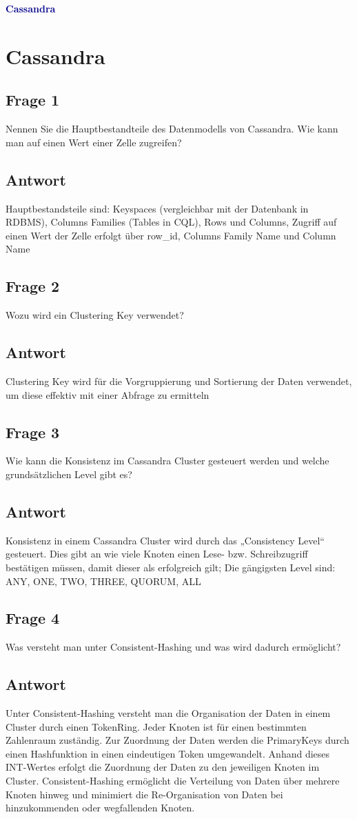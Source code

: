 \textbf{\textcolor{darkblue}{ Cassandra}}~

\section*{Cassandra}
\subsection*{Frage 1}
Nennen Sie die Hauptbestandteile des Datenmodells von Cassandra. Wie kann man auf einen Wert einer Zelle zugreifen?
\subsection*{Antwort}
Hauptbestandsteile sind: Keyspaces (vergleichbar mit der Datenbank in RDBMS), 
Columns Families (Tables in CQL), 
Rows und Columns,
Zugriff auf einen Wert der Zelle erfolgt über row_id, Columns Family Name und Column Name
\subsection*{Frage 2}
Wozu wird ein Clustering Key verwendet?
\subsection*{Antwort}
Clustering Key wird für die Vorgruppierung und Sortierung der Daten verwendet, um diese effektiv mit einer Abfrage zu ermitteln
\subsection*{Frage 3}
Wie kann die Konsistenz im Cassandra Cluster gesteuert werden und welche grundsätzlichen Level gibt es?
\subsection*{Antwort}
Konsistenz in einem Cassandra Cluster wird durch das „Consistency Level“ gesteuert. Dies gibt an wie viele Knoten einen Lese- bzw. Schreibzugriff bestätigen müssen, damit dieser als erfolgreich gilt;
Die gängigsten Level sind: ANY, ONE, TWO, THREE, QUORUM, ALL

\subsection*{Frage 4}
Was versteht man unter Consistent-Hashing und was wird dadurch ermöglicht?
\subsection*{Antwort}
Unter Consistent-Hashing versteht man die Organisation der Daten in einem Cluster durch einen TokenRing. Jeder Knoten ist für einen bestimmten Zahlenraum zuständig. Zur Zuordnung der Daten werden die PrimaryKeys durch einen Hashfunktion in einen eindeutigen Token umgewandelt. Anhand dieses INT-Wertes erfolgt die Zuordnung der Daten zu den jeweiligen Knoten im Cluster. 
Consistent-Hashing ermöglicht die Verteilung von Daten über mehrere Knoten hinweg und minimiert die Re-Organisation von Daten bei hinzukommenden oder wegfallenden Knoten.
